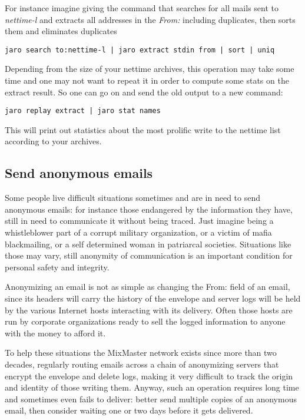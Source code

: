 \documentclass[a4,onecolumn,portrait]{article}
\begin{document}
For instance imagine giving the command that searches for all mails sent to \emph{nettime-l} and extracts all addresses in the \emph{From:} including duplicates, then sorts them and eliminates duplicates

\begin{verbatim}
jaro search to:nettime-l | jaro extract stdin from | sort | uniq
\end{verbatim}

Depending from the size of your nettime archives, this operation may take some time and one may not want to repeat it in order to compute some stats on the extract result. So one can go on and send the old output to a new command:

\begin{verbatim}
jaro replay extract | jaro stat names
\end{verbatim}

This will print out statistics about the most prolific write to the nettime list according to your archives.
\subsection{Send anonymous emails}
\label{sec-12-2}

Some people live difficult situations sometimes and are in need to
send anonymous emails: for instance those endangered by the
information they have, still in need to communicate it without
being traced. Just imagine being a whistleblower part of a corrupt
military organization, or a victim of mafia blackmailing, or a self
determined woman in patriarcal societies. Situations like those may
vary, still anonymity of communication is an important condition
for personal safety and integrity.

Anonymizing an email is not as simple as changing the From: field
of an email, since its headers will carry the history of the
envelope and server logs will be held by the various Internet hosts
interacting with its delivery. Often those hosts are run by
corporate organizations ready to sell the logged information to
anyone with the money to afford it.

To help these situations the MixMaster network exists since more
than two decades, regularly routing emails across a chain of
anonymizing servers that encrypt the envelope and delete logs,
making it very difficult to track the origin and identity of those
writing them. Anyway, such an operation requires long time and
sometimes even fails to deliver: better send multiple copies of an
anonymous email, then consider waiting one or two days before it
gets delivered.
\end{document}
